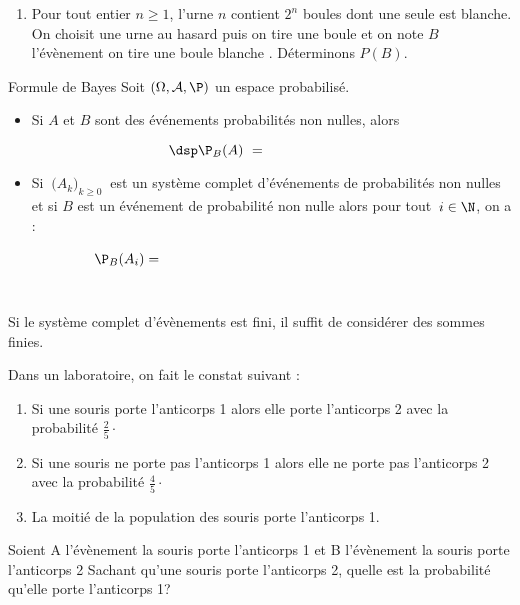 \documentclass[a4paper,10pt]{report}
\begin{document}
\begin{itemize}
\begin{itemize}
\begin{Exemple}
\begin{enumerate}
\vspace{5cm}
\item Pour tout entier $n \geq 1$, l'urne $n$ contient $2^n$ boules dont une seule est blanche. On choisit une urne au hasard puis on tire une boule et on note $B$ l'évènement \og on tire une boule blanche \fg . Déterminons $P(B)$. 

\vspace{6cm}
\end{enumerate}
\end{Exemple}

\begin{Proposition}{Formule de Bayes}
Soit $(\Omega, \mathcal{A}, \P)$ un espace probabilisé.
\begin{itemize}
\item Si $A$ et $B$ sont des événements probabilités non nulles, alors

\[ \dsp \P_B(A)\ = \qquad \qquad \qquad \qquad \]

\item Si $\ \big(A_k\big)_{k \geq 0}\ $ est un système complet d'événements de probabilités non nulles et si $B$ est un événement de probabilité non nulle alors pour tout $\,i\in\N$, on a :
$$\P_B(A_i) = \phantom{\frac{\ \P(A_i)\times  \P_{A_i}(B)\ }{ \P(B)} 
= \frac{\P(A_i)\times  \P_{A_i}(B)}{\ \sum\limits_{k=0}^{+\infty} \P(A_k)\times  \P_{A_k}(B)\ }}$$
\end{itemize}
\end{Proposition}

\begin{Remarque}{} Si le système complet d'évènements est fini, il suffit de considérer des sommes finies.
\end{Remarque}

\begin{Exemple} Dans un laboratoire, on fait le constat suivant :
\begin{enumerate}
\item Si une souris porte l'anticorps 1 alors elle porte l'anticorps 2 avec la probabilité $\frac{2}{5} \cdot$

\vspace{-0.2cm}
\item Si une souris ne porte pas l'anticorps 1 alors elle ne porte pas l'anticorps 2 avec la probabilité $\frac{4}{5} \cdot$
\item La moitié de la population des souris porte l'anticorps 1.
\end{enumerate}

\medskip
Soient A l'évènement \og la souris porte l'anticorps 1 \fg et B l'évènement \og la souris porte l'anticorps 2 \fg 
Sachant qu'une souris porte l'anticorps 2, quelle est la probabilité qu'elle porte l'anticorps 1?


\end{Exemple}
\end{itemize}
\end{itemize}
\end{document}
